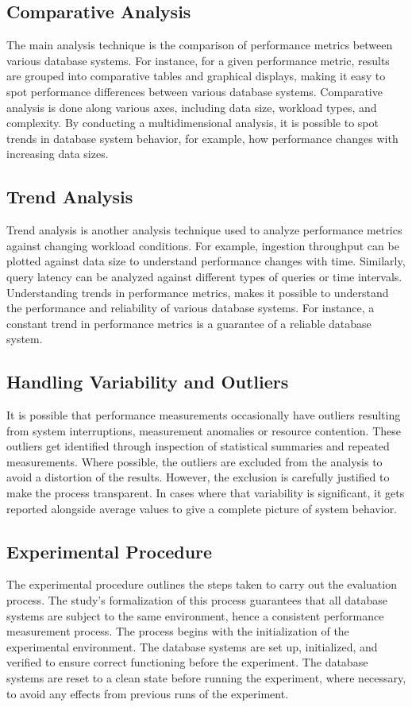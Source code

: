\subsection{Comparative Analysis}
The main analysis technique is the comparison of performance metrics between various database systems. For instance, for a given performance metric, results are grouped into comparative tables and graphical displays, making it easy to spot performance differences between various database systems. Comparative analysis is done along various axes, including data size, workload types, and complexity. By conducting a multidimensional analysis, it is possible to spot trends in database system behavior, for example, how performance changes with increasing data sizes.



\subsection{Trend Analysis}
Trend analysis is another analysis technique used to analyze performance metrics against changing workload conditions. For example, ingestion throughput can be plotted against data size to understand performance changes with time. Similarly, query latency can be analyzed against different types of queries or time intervals. Understanding trends in performance metrics, makes it possible to understand the performance and reliability of various database systems. For instance, a constant trend in performance metrics is a guarantee of a reliable database system.


\subsection{Handling Variability and Outliers}
It is possible that performance measurements occasionally have outliers resulting from system interruptions, measurement anomalies or resource contention. These outliers get identified through inspection of statistical summaries and repeated measurements. Where possible, the outliers are excluded from the analysis to avoid a distortion of the results. However, the exclusion is carefully justified to make the process transparent. In cases where that variability is significant, it gets reported alongside average values to give a complete picture of system behavior. 


\subsection{Experimental Procedure}
The experimental procedure outlines the steps taken to carry out the evaluation process. The study’s formalization of this process guarantees that all database systems are subject to the same environment, hence a consistent performance measurement process. The process begins with the initialization of the experimental environment. The database systems are set up, initialized, and verified to ensure correct functioning before the experiment. The database systems are reset to a clean state before running the experiment, where necessary, to avoid any effects from previous runs of the experiment.


